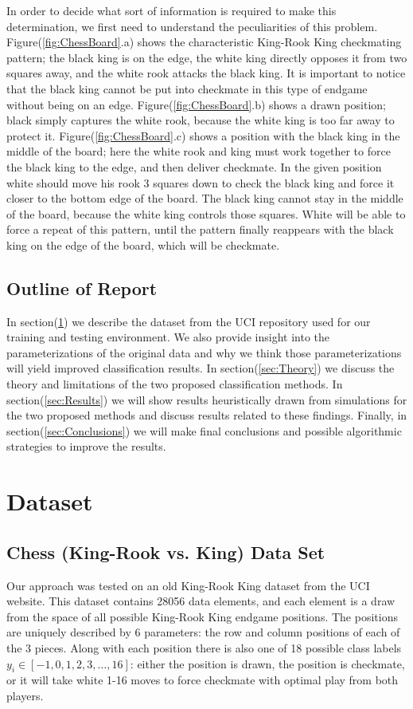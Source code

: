 \documentclass[fleqn]{article}
\begin{document}
In order to decide what sort of information is required to make this determination, we first need to understand the peculiarities of this problem. Figure(\ref{fig:ChessBoard}.a) shows the characteristic King-Rook King checkmating pattern; the black king is on the edge, the white king directly opposes it from two squares away, and the white rook attacks the black king. It is important to notice that the black king cannot be put into checkmate in this type of endgame without being on an edge. Figure(\ref{fig:ChessBoard}.b) shows a drawn position; black simply captures the white rook, because the white king is too far away to protect it. Figure(\ref{fig:ChessBoard}.c) shows a position with the black king in the middle of the board; here the white rook and king must work together to force the black king to the edge, and then deliver checkmate. In the given position white should move his rook 3 squares down to check the black king and force it closer to the bottom edge of the board. The black king cannot stay in the middle of the board, because the white king controls those squares. White will be able to force a repeat of this pattern, until the pattern finally reappears with the black king on the edge of the board, which will be checkmate.
%
\subsection{Outline of Report}
\label{subsec:outline}
In section(\ref{sec:Dataset}) we describe the dataset from the UCI repository used for our training and testing environment.  We also provide insight into the parameterizations of the original data and why we think those parameterizations will yield improved classification results.  In section(\ref{sec:Theory}) we discuss the theory and limitations of the two proposed classification methods.  In section(\ref{sec:Results}) we will show results heuristically drawn from simulations for the two proposed methods and discuss results related to these findings.  Finally, in section(\ref{sec:Conclusions}) we will make final conclusions and possible algorithmic strategies to improve the results. 

\section{Dataset}
\label{sec:Dataset}

\subsection{Chess (King-Rook vs. King) Data Set}
\label{subsec:dataset}
Our approach was tested on an old King-Rook King dataset from the UCI website\cite{MichaelBain:1994}. This dataset contains 28056 data elements, and each element is a draw from the space of all possible King-Rook King endgame positions. The positions are uniquely described by 6 parameters: the row and column positions of each of the 3 pieces. Along with each position there is also one of 18 possible class labels $y_i \in [-1,0,1,2,3,\dots,16]$: either the position is drawn, the position is checkmate, or it will take white 1-16 moves to force checkmate with optimal play from both players.
\end{document}
